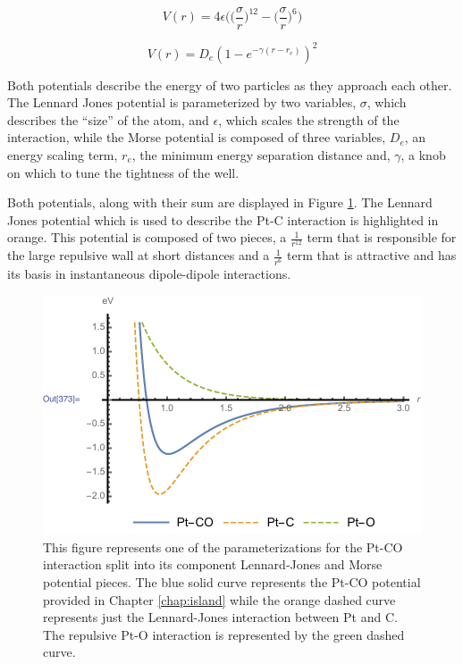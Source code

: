 \begin{equation}
V(r) = 4\epsilon\bigg(\bigg(\frac{\sigma}{r}\bigg)^12 - \bigg(\frac{\sigma}{r}\bigg)^6\bigg)
\label{eq:lj}
\end{equation}

\begin{equation}
V(r) = D_e(1-e^{-\gamma(r-r_e)})^2
\label{eq:mp}
\end{equation}


Both potentials describe the energy of two particles as they approach each
other. The Lennard Jones potential is parameterized by two variables, $\sigma$,
which describes the ``size'' of the atom, and $\epsilon$, which scales the
strength of the interaction, while the Morse potential is composed of three
variables, $D_e$, an energy scaling term, $r_e$, the minimum energy separation
distance and, $\gamma$, a knob on which to tune the tightness of the well.

Both potentials, along with their sum are displayed in Figure
\ref{fig:potentials}. The Lennard Jones potential which is used to describe the
Pt-C interaction is highlighted in orange. This potential is composed of two
pieces, a $\frac{1}{r^{12}}$ term that is responsible for the large repulsive
wall at short distances and a $\frac{1}{r^{6}}$ term that is attractive and has
its basis in instantaneous dipole-dipole interactions.


\begin{figure}
\centering
\includegraphics[width=\linewidth]{../figures/chap1/bindingEnergy.pdf}
\caption{This figure represents one of the parameterizations for the Pt-CO
interaction split into its component Lennard-Jones and Morse potential pieces.
The blue solid curve represents the Pt-CO potential provided in Chapter
\ref{chap:island} while the orange dashed curve represents just the
Lennard-Jones interaction between Pt and C. The repulsive Pt-O interaction is
represented by the green dashed curve.}
\label{fig:potentials}
\end{figure}

